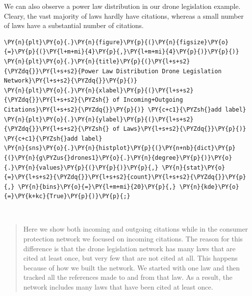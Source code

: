     We can also observe a power law distribution in our drone legislation
example. Cleary, the vast majority of laws hardly have citations,
whereas a small number of laws have a substantial number of citations.

    \begin{tcolorbox}[breakable, size=fbox, boxrule=1pt, pad at break*=1mm,colback=cellbackground, colframe=cellborder]
\begin{Verbatim}[commandchars=\\\{\}]
\PY{n}{plt}\PY{o}{.}\PY{n}{figure}\PY{p}{(}\PY{n}{figsize}\PY{o}{=}\PY{p}{(}\PY{l+m+mi}{4}\PY{p}{,}\PY{l+m+mi}{4}\PY{p}{)}\PY{p}{)}
\PY{n}{plt}\PY{o}{.}\PY{n}{title}\PY{p}{(}\PY{l+s+s2}{\PYZdq{}}\PY{l+s+s2}{Power Law Distribution Drone Legislation Network}\PY{l+s+s2}{\PYZdq{}}\PY{p}{)}
\PY{n}{plt}\PY{o}{.}\PY{n}{xlabel}\PY{p}{(}\PY{l+s+s2}{\PYZdq{}}\PY{l+s+s2}{\PYZsh{} of Incoming+Outgoing Citations}\PY{l+s+s2}{\PYZdq{}}\PY{p}{)} \PY{c+c1}{\PYZsh{}add label}
\PY{n}{plt}\PY{o}{.}\PY{n}{ylabel}\PY{p}{(}\PY{l+s+s2}{\PYZdq{}}\PY{l+s+s2}{\PYZsh{} of Laws}\PY{l+s+s2}{\PYZdq{}}\PY{p}{)} \PY{c+c1}{\PYZsh{}add label}
\PY{n}{sns}\PY{o}{.}\PY{n}{histplot}\PY{p}{(}\PY{n+nb}{dict}\PY{p}{(}\PY{n}{g\PYZus{}drones1}\PY{o}{.}\PY{n}{degree}\PY{p}{)}\PY{o}{.}\PY{n}{values}\PY{p}{(}\PY{p}{)}\PY{p}{,} \PY{n}{stat}\PY{o}{=}\PY{l+s+s2}{\PYZdq{}}\PY{l+s+s2}{count}\PY{l+s+s2}{\PYZdq{}}\PY{p}{,} \PY{n}{bins}\PY{o}{=}\PY{l+m+mi}{20}\PY{p}{,} \PY{n}{kde}\PY{o}{=}\PY{k+kc}{True}\PY{p}{)}\PY{p}{;} 
\end{Verbatim}
\end{tcolorbox}

    \begin{center}
    \end{center}
    { \hspace*{\fill} \\}
    
    \begin{quote}
Here we show both incoming and outgoing citations while in the consumer
protection network we focused on incoming citations. The reason for this
difference is that the drone legislation network has many laws that are
cited at least once, but very few that are not cited at all. This
happens because of how we built the network. We started with one law and
then tracked all the references made to and from that law. As a result,
the network includes many laws that have been cited at least once.
\end{quote}

